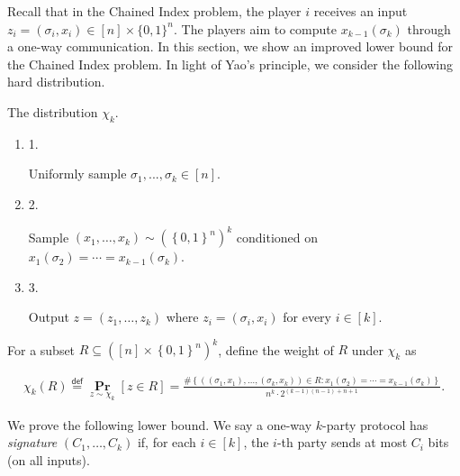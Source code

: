 Recall that in the Chained Index problem, the player $i$ receives an input $z_{i}=(\sigma_{i},x_{i})\in[n]\times\{0,1\}^{n}$. The players aim to compute $x_{k-1}(\sigma_{k})$ through a one-way communication. In this section, we show an improved lower bound for the Chained Index problem. In light of Yao’s principle, we consider the following hard distribution.\par



The distribution $\chi_{k}$.\par


\begin{enumerate}


\item[] 
1. 


Uniformly sample $\sigma_{1},...,\sigma_{k}\in[n]$.\par





\item[] 
2. 


Sample $(x_{1},\dots,x_{k})\sim(\left\{0,1\right\}^{n})^{k}$ conditioned on
$x_{1}(\sigma_{2})=\cdots=x_{k-1}(\sigma_{k})$.\par





\item[] 
3. 


Output $z=(z_{1},\dots,z_{k})$ where $z_{i}=(\sigma_{i},x_{i})$ for every $i\in[k]$.\par





\end{enumerate}



For a subset $R\subseteq([n]\times\left\{0,1\right\}^{n})^{k}$, define the weight of $R$ under $\chi_{k}$ as\par


\[\begin{gathered}
\chi_{k}(R)\stackrel{{\scriptstyle\mathsf{def}}}{{=}}\operatorname*{\mathbf{Pr}}_{z\sim\chi_{k}}\left[z\in R\right]=\frac{\#{\left\{((\sigma_{1},x_{1}),\dots,(\sigma_{k},x_{k}))\in R:x_{1}(\sigma_{2})=\cdots=x_{k-1}(\sigma_{k})\right\}}}{n^{k}\cdot 2^{(k-1)(n-1)+n+1}}.
\end{gathered}\]


We prove the following lower bound.
We say a one-way $k$-party protocol has \emph{signature} $(C_{1},\dots,C_{k})$ if, for each $i\in[k]$, the $i$-th party sends at most $C_{i}$ bits (on all inputs).\par



